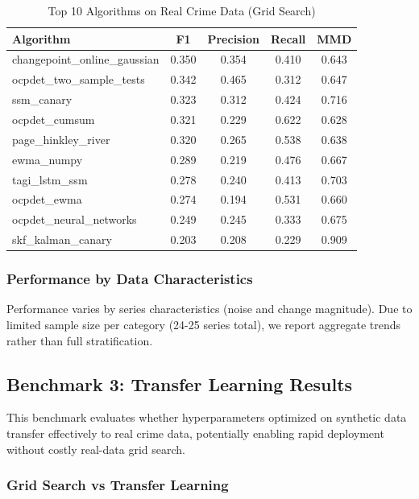 \documentclass[journal,article,submit,pdftex,moreauthors]{Definitions/mdpi}
\begin{document}
\begin{table}[ht]
\centering
\caption{Top 10 Algorithms on Real Crime Data (Grid Search)}
\label{tab:real_top10}
\small
\begin{tabular}{lcccc}
\toprule
\textbf{Algorithm} & \textbf{F1} & \textbf{Precision} & \textbf{Recall} & \textbf{MMD} \\
\midrule
changepoint\_online\_gaussian & 0.350 & 0.354 & 0.410 & 0.643 \\
ocpdet\_two\_sample\_tests & 0.342 & 0.465 & 0.312 & 0.647 \\
ssm\_canary & 0.323 & 0.312 & 0.424 & 0.716 \\
ocpdet\_cumsum & 0.321 & 0.229 & 0.622 & 0.628 \\
page\_hinkley\_river & 0.320 & 0.265 & 0.538 & 0.638 \\
ewma\_numpy & 0.289 & 0.219 & 0.476 & 0.667 \\
tagi\_lstm\_ssm & 0.278 & 0.240 & 0.413 & 0.703 \\
ocpdet\_ewma & 0.274 & 0.194 & 0.531 & 0.660 \\
ocpdet\_neural\_networks & 0.249 & 0.245 & 0.333 & 0.675 \\
skf\_kalman\_canary & 0.203 & 0.208 & 0.229 & 0.909 \\
\bottomrule
\end{tabular}
\end{table}


\subsubsection{Performance by Data Characteristics}

Performance varies by series characteristics (noise and change magnitude). Due to limited sample size per category (24-25 series total), we report aggregate trends rather than full stratification.


\clearpage

\subsection{Benchmark 3: Transfer Learning Results}
\label{sec:results_transfer}

This benchmark evaluates whether hyperparameters optimized on synthetic data transfer effectively to real crime data, potentially enabling rapid deployment without costly real-data grid search.

\subsubsection{Grid Search vs Transfer Learning}
\end{document}
